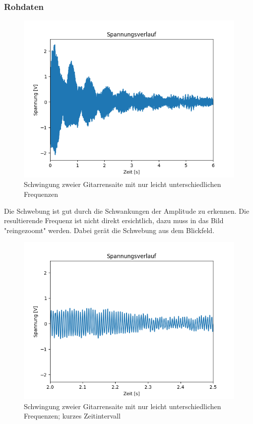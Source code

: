 \documentclass[12pt,a4paper]{article}
\begin{document}
\subsubsection{Rohdaten}
\begin{figure}
\includegraphics[scale=1]{Bilder/Schwebung_roh.png}
\centering
\caption{Schwingung zweier Gitarrensaite mit nur leicht unterschiedlichen Frequenzen}
\label{Schwebung_roh}
\end{figure}
Die Schwebung ist gut durch die Schwankungen der Amplitude zu erkennen. Die resultierende Frequenz ist nicht direkt ersichtlich, dazu muss in das Bild "reingezoomt" werden. Dabei gerät die Schwebung aus dem Blickfeld.
\begin{figure}
\includegraphics[scale=1]{Bilder/Schwebung_reingezoomt.png}
\centering
\caption{Schwingung zweier Gitarrensaite mit nur leicht unterschiedlichen Frequenzen; kurzes Zeitintervall}
\label{Schwebung_zoom}
\end{figure}
\end{document}
